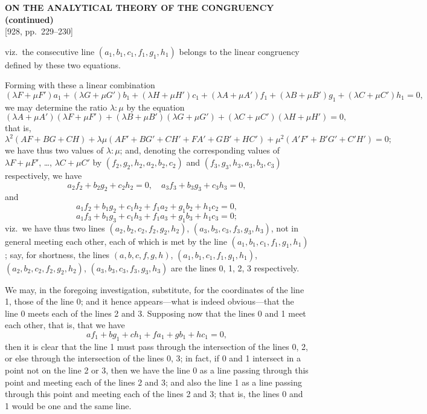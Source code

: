 \documentclass[11pt,a4paper]{article}
\begin{document}
\setcounter{page}{229}

\begin{center}
{\large\bfseries ON THE ANALYTICAL THEORY OF THE CONGRUENCY (continued)}\\[0.4em]
{\small [928, pp.\ 229--230]}
\end{center}
\vspace{0.4em}

viz.\ the consecutive line $(a_1, b_1, c_1, f_1, g_1, h_1)$ belongs to the linear congruency defined by these two equations.

Forming with these a linear combination
\[
(\lambda F + \mu F') a_1 + (\lambda G + \mu G') b_1 + (\lambda H + \mu H') c_1 + (\lambda A + \mu A') f_1 + (\lambda B + \mu B') g_1 + (\lambda C + \mu C') h_1 = 0,
\]
we may determine the ratio $\lambda : \mu$ by the equation
\[
(\lambda A + \mu A')(\lambda F + \mu F') + (\lambda B + \mu B')(\lambda G + \mu G') + (\lambda C + \mu C')(\lambda H + \mu H') = 0,
\]
that is,
\[
\lambda^2 (AF + BG + CH) + \lambda\mu (AF' + BG' + CH' + FA' + GB' + HC') + \mu^2 (A'F' + B'G' + C'H') = 0;
\]
we have thus two values of $\lambda : \mu$; and, denoting the corresponding values of $\lambda F + \mu F'$, \ldots, $\lambda C + \mu C'$ by $(f_2, g_2, h_2, a_2, b_2, c_2)$ and $(f_3, g_3, h_3, a_3, b_3, c_3)$ respectively, we have
\[
a_2 f_2 + b_2 g_2 + c_2 h_2 = 0,\quad a_3 f_3 + b_3 g_3 + c_3 h_3 = 0,
\]
and
\[
a_1 f_2 + b_1 g_2 + c_1 h_2 + f_1 a_2 + g_1 b_2 + h_1 c_2 = 0,
\]
\[
a_1 f_3 + b_1 g_3 + c_1 h_3 + f_1 a_3 + g_1 b_3 + h_1 c_3 = 0;
\]
viz.\ we have thus two lines $(a_2, b_2, c_2, f_2, g_2, h_2)$, $(a_3, b_3, c_3, f_3, g_3, h_3)$, not in general meeting each other, each of which is met by the line $(a_1, b_1, c_1, f_1, g_1, h_1)$; say, for shortness, the lines $(a, b, c, f, g, h)$, $(a_1, b_1, c_1, f_1, g_1, h_1)$, $(a_2, b_2, c_2, f_2, g_2, h_2)$, $(a_3, b_3, c_3, f_3, g_3, h_3)$ are the lines 0, 1, 2, 3 respectively.

We may, in the foregoing investigation, substitute, for the coordinates of the line 1, those of the line 0; and it hence appears---what is indeed obvious---that the line 0 meets each of the lines 2 and 3. Supposing now that the lines 0 and 1 meet each other, that is, that we have
\[
a f_1 + b g_1 + c h_1 + f a_1 + g b_1 + h c_1 = 0,
\]
then it is clear that the line 1 must pass through the intersection of the lines 0, 2, or else through the intersection of the lines 0, 3; in fact, if 0 and 1 intersect in a point not on the line 2 or 3, then we have the line 0 as a line passing through this point and meeting each of the lines 2 and 3; and also the line 1 as a line passing through this point and meeting each of the lines 2 and 3; that is, the lines 0 and 1 would be one and the same line.
\end{document}
